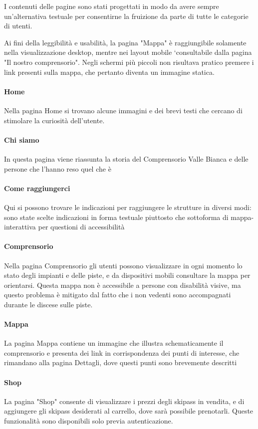 I contenuti delle pagine sono stati progettati in modo da avere sempre un'alternativa testuale per consentirne la fruizione da parte di tutte le categorie di utenti.

Ai fini della leggibilità e usabilità, la pagina "Mappa" è raggiungibile solamente nella visualizzazione desktop, mentre nei layout mobile `consultabile dalla pagina "Il nostro comprensorio".
Negli schermi più piccoli non risultava pratico premere i link presenti sulla mappa, che pertanto diventa un immagine statica.
\paragraph{Home} Nella pagina Home si trovano alcune immagini e dei brevi testi che cercano di stimolare la curiosità dell'utente.
\paragraph{Chi siamo}
In questa pagina viene riassunta la storia del Comprensorio Valle Bianca e delle persone che l'hanno reso quel che è
\paragraph{Come raggiungerci}
Qui si possono trovare le indicazioni per raggiungere le strutture in diversi modi: sono state scelte indicazioni in forma testuale piuttosto che sottoforma di mappa-interattiva per questioni di accessibilità
\paragraph{Comprensorio}
Nella pagina Comprensorio gli utenti possono visualizzare in ogni momento lo stato degli impianti e delle piste, e da dispositivi mobili consultare la mappa per orientarsi. Questa mappa non è accessibile a persone con disabilità visive, ma questo problema è mitigato dal fatto che i non vedenti sono accompagnati durante le discese sulle piste.
\paragraph{Mappa}
La pagina Mappa contiene un immagine che illustra schematicamente il comprensorio e presenta dei link in corrispondenza dei punti di interesse, che rimandano alla pagina Dettagli, dove  questi punti sono brevemente descritti
\paragraph{Shop}
La pagina "Shop" consente di visualizzare i prezzi degli skipass in vendita, e di aggiungere gli skipass desiderati al carrello, dove sarà possibile prenotarli. Queste funzionalità sono disponibili solo previa autenticazione.
